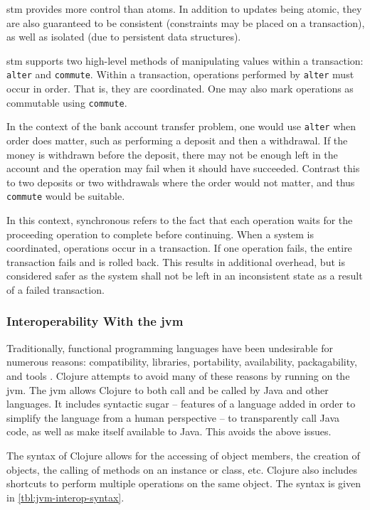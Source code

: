 			\gls{stm} provides more control than atoms.  In addition to updates being atomic, they are also guaranteed to be consistent (constraints may be placed on a transaction), as well as isolated (due to persistent data structures).
			
			\gls{stm} supports two high-level methods of manipulating values within a transaction:  \texttt{alter} and \texttt{commute}.  Within a transaction, operations performed by \texttt{alter} must occur in order.  That is, they are coordinated.  One may also mark operations as commutable using \texttt{commute}.
			
			In the context of the bank account transfer problem, one would use \texttt{alter} when order does matter, such as performing a deposit and then a withdrawal.  If the money is withdrawn before the deposit, there may not be enough left in the account and the operation may fail when it should have succeeded.  Contrast this to two deposits or two withdrawals where the order would not matter, and thus \texttt{commute} would be suitable.
			
			In this context, synchronous refers to the fact that each operation waits for the proceeding operation to complete before continuing.  When a system is coordinated, operations occur in a transaction.  If one operation fails, the entire transaction fails and is rolled back.  This results in additional overhead, but is considered safer as the system shall not be left in an inconsistent state as a result of a failed transaction.
			
		\subsubsection{Interoperability With the \gls{jvm}}
			Traditionally, functional programming languages have been undesirable for numerous reasons:  compatibility, libraries, portability, availability, packagability, and tools \cite{no-fp-98}.  Clojure attempts to avoid many of these reasons by running on the \gls{jvm}.  The \gls{jvm} allows Clojure to both call and be called by Java and other languages.  It includes syntactic sugar -- features of a language added in order to simplify the language from a human perspective -- to transparently call Java code, as well as make itself available to Java.  This avoids the above issues.
			
			The syntax of Clojure allows for the accessing of object members, the creation of objects, the calling of methods on an instance or class, etc.  Clojure also includes shortcuts to perform multiple operations on the same object.  The syntax is given in \vref{tbl:jvm-interop-syntax}.
			
